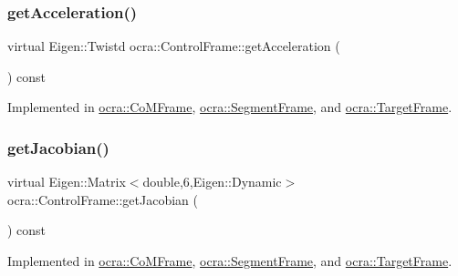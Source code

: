 \hypertarget{classocra_1_1ControlFrame_a0ceb7cd7c3fe90fa0ef311b96a6f5c88}{}\label{classocra_1_1ControlFrame_a0ceb7cd7c3fe90fa0ef311b96a6f5c88} 
\subsubsection{\texorpdfstring{get\+Acceleration()}{getAcceleration()}}
{\footnotesize\ttfamily virtual Eigen\+::\+Twistd ocra\+::\+Control\+Frame\+::get\+Acceleration (\begin{DoxyParamCaption}{ }\end{DoxyParamCaption}) const\hspace{0.3cm}{\ttfamily [pure virtual]}}



Implemented in \hyperlink{classocra_1_1CoMFrame_a9e59ca65720c553da5c75f484544829c}{ocra\+::\+Co\+M\+Frame}, \hyperlink{classocra_1_1SegmentFrame_aa8f7f9544b59da591d94ac8e6a8a9e5d}{ocra\+::\+Segment\+Frame}, and \hyperlink{classocra_1_1TargetFrame_ab38d91f0d2f90b102259ec155a8a1245}{ocra\+::\+Target\+Frame}.

\hypertarget{classocra_1_1ControlFrame_a14e0b855979be5dbd360314f25191e77}{}\label{classocra_1_1ControlFrame_a14e0b855979be5dbd360314f25191e77} 
\subsubsection{\texorpdfstring{get\+Jacobian()}{getJacobian()}}
{\footnotesize\ttfamily virtual Eigen\+::\+Matrix$<$double,6,Eigen\+::\+Dynamic$>$ ocra\+::\+Control\+Frame\+::get\+Jacobian (\begin{DoxyParamCaption}{ }\end{DoxyParamCaption}) const\hspace{0.3cm}{\ttfamily [pure virtual]}}



Implemented in \hyperlink{classocra_1_1CoMFrame_ab24f3400af3e8eb2a12d6597ff8a7a31}{ocra\+::\+Co\+M\+Frame}, \hyperlink{classocra_1_1SegmentFrame_a1ece38dd51a3331dfe3de7911ad9291e}{ocra\+::\+Segment\+Frame}, and \hyperlink{classocra_1_1TargetFrame_a94d2746633b7112afae754370a3a3e1f}{ocra\+::\+Target\+Frame}.

